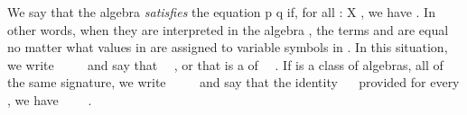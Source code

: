 We say that the algebra  \emph{satisfies} the equation \ab p  \ab q if,
for all  : \ab X  ,
we have       .
In other words, when they are interpreted in the algebra ,
the terms  and  are equal no matter what values in  are assigned to variable symbols in .
In this situation, we write
~~~~ and say that   ~~,
or that  is a  of ~~.
If  is a class of algebras, all of the same signature, we write ~~~~
and say that   the identity ~~ provided for every   ,
we have ~~~~.

